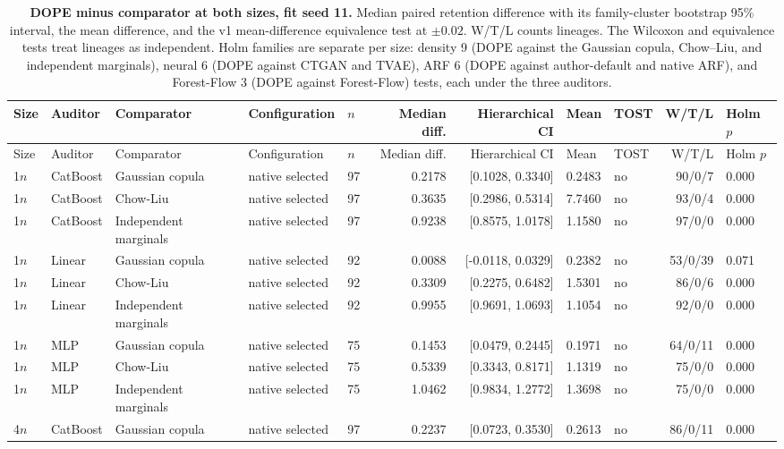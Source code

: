 \begin{longtable}{lllllrrllrl}
\caption{\textbf{DOPE minus comparator at both sizes, fit seed 11.} Median paired retention difference with its family-cluster bootstrap 95\% interval, the mean difference, and the v1 mean-difference equivalence test at $\pm 0.02$. W/T/L counts lineages. The Wilcoxon and equivalence tests treat lineages as independent. Holm families are separate per size: density 9 (DOPE against the Gaussian copula, Chow--Liu, and independent marginals), neural 6 (DOPE against CTGAN and TVAE), ARF 6 (DOPE against author-default and native ARF), and Forest-Flow 3 (DOPE against Forest-Flow) tests, each under the three auditors.}\label{tab:review-paired}\\
\toprule
Size & Auditor & Comparator & Configuration & $n$ & Median diff. & Hierarchical CI & Mean & TOST & W/T/L & Holm $p$ \\
\midrule
\endfirsthead
\toprule
Size & Auditor & Comparator & Configuration & $n$ & Median diff. & Hierarchical CI & Mean & TOST & W/T/L & Holm $p$ \\
\midrule
\endhead
1$n$ & CatBoost & Gaussian copula & native selected & 97 & 0.2178 & [0.1028, 0.3340] & 0.2483 & no & 90/0/7 & 0.000 \\
1$n$ & CatBoost & Chow-Liu & native selected & 97 & 0.3635 & [0.2986, 0.5314] & 7.7460 & no & 93/0/4 & 0.000 \\
1$n$ & CatBoost & Independent marginals & native selected & 97 & 0.9238 & [0.8575, 1.0178] & 1.1580 & no & 97/0/0 & 0.000 \\
1$n$ & Linear & Gaussian copula & native selected & 92 & 0.0088 & [-0.0118, 0.0329] & 0.2382 & no & 53/0/39 & 0.071 \\
1$n$ & Linear & Chow-Liu & native selected & 92 & 0.3309 & [0.2275, 0.6482] & 1.5301 & no & 86/0/6 & 0.000 \\
1$n$ & Linear & Independent marginals & native selected & 92 & 0.9955 & [0.9691, 1.0693] & 1.1054 & no & 92/0/0 & 0.000 \\
1$n$ & MLP & Gaussian copula & native selected & 75 & 0.1453 & [0.0479, 0.2445] & 0.1971 & no & 64/0/11 & 0.000 \\
1$n$ & MLP & Chow-Liu & native selected & 75 & 0.5339 & [0.3343, 0.8171] & 1.1319 & no & 75/0/0 & 0.000 \\
1$n$ & MLP & Independent marginals & native selected & 75 & 1.0462 & [0.9834, 1.2772] & 1.3698 & no & 75/0/0 & 0.000 \\
4$n$ & CatBoost & Gaussian copula & native selected & 97 & 0.2237 & [0.0723, 0.3530] & 0.2613 & no & 86/0/11 & 0.000 \\

\end{longtable}
